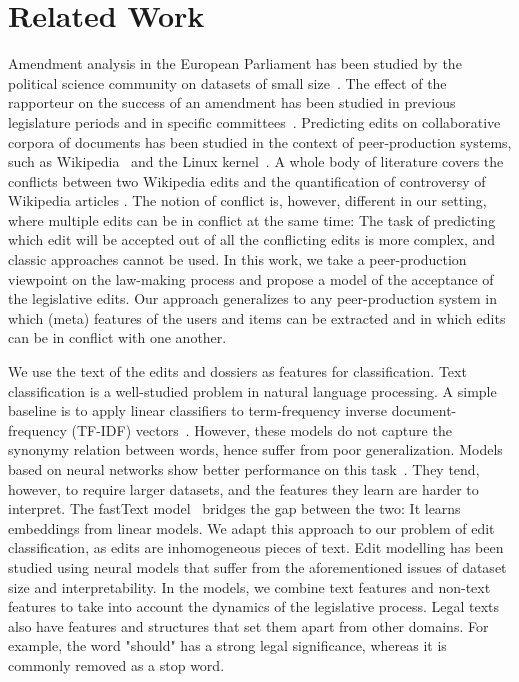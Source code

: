 \section{Related Work}
\label{lmp:sec:relwork}

Amendment analysis in the European Parliament has been studied by the political science community on datasets of small size~\cite{kreppel1999affects,tsebelis2001legislative,kreppel2002moving,baller2017specialists}.
The effect of the rapporteur on the success of an amendment has been studied in previous legislature periods and in specific committees~\cite{finke2012proposal,hurka2013changing}.
Predicting edits on collaborative corpora of documents has been studied in the context of peer-production systems, such as Wikipedia~\cite{druck2008learning,adler2007content,sarkar2019stre} and the Linux kernel~\cite{jiang2013will,yardim2018can}.
A whole body of literature covers the conflicts between two Wikipedia edits \cite{sumi2011edit,yasseri2012dynamics} and the quantification of controversy of Wikipedia articles \cite{sepehri2012leveraging,rad2012identifying}.
The notion of conflict is, however, different in our setting, where multiple edits can be in conflict at the same time:
The task of predicting which edit will be accepted out of all the conflicting edits is more complex, and classic approaches cannot be used.
In this work, we take a peer-production viewpoint on the law-making process and propose a model of the acceptance of the legislative edits.
Our approach generalizes to any peer-production system in which (meta) features of the users and items can be extracted and in which edits can be in conflict with one another.

We use the text of the edits and dossiers as features for classification.
Text classification is a well-studied problem in natural language processing.
A simple baseline is to apply linear classifiers to term-frequency inverse document-frequency (TF-IDF) vectors~\cite{joachims1998text}.
However, these models do not capture the synonymy relation between words, hence suffer from poor generalization.
Models based on neural networks show better performance on this task~\cite{zhang2015character}.
They tend, however, to require larger datasets, and the features they learn are harder to interpret.
The fastText model~\cite{joulin2017bag} bridges the gap between the two:
It learns embeddings from linear models.
We adapt this approach to our problem of edit classification, as edits are inhomogeneous pieces of text.
Edit modelling has been studied using neural models\cite{yin2018learning,guu2018generating} that suffer from the aforementioned issues of dataset size and interpretability.
In the \warofwords{} models, we combine text features and non-text features to take into account the dynamics of the legislative process.
Legal texts also have features and structures that set them apart from other domains.
For example, the word "should" has a strong legal significance, whereas it is commonly removed as a stop word.

